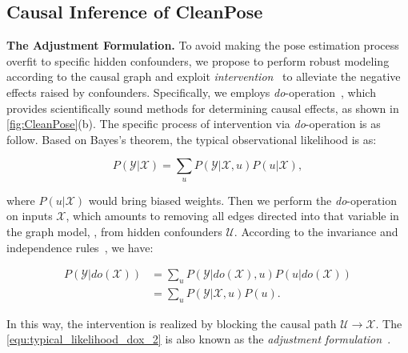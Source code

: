 \subsection{Causal Inference of CleanPose}
\label{sec:causal_inference}
{\bf The Adjustment Formulation.} 
To avoid making the pose estimation process overfit to specific hidden confounders, we propose to perform robust modeling according to the causal graph and exploit \emph{intervention}~\cite{pearl2009causality} to alleviate the negative effects raised by confounders. Specifically, we employs \emph{do}-operation~\cite{pearl2016causal}, which provides scientifically sound methods for determining causal effects, as shown in \cref{fig:CleanPose}(b). The specific process of intervention via \emph{do}-operation is as follow.
Based on Bayes's theorem, the typical observational likelihood is as:
\begin{small}
\begin{equation}
\label{equ:typical_likelihood}
    P(\mathcal{Y}|\mathcal{X}) = \sum_{u}P(\mathcal{Y}|\mathcal{X},u)P(u|\mathcal{X}),
\end{equation}
\end{small}
where $P(u|\mathcal{X})$ would bring biased weights. Then we perform the \emph{do}-operation on inputs $\mathcal{X}$, which amounts to removing all edges directed into that variable in the graph model, \ie, from hidden confounders $\mathcal{U}$. According to the invariance and independence rules~\cite{pearl2016causal}, we have:
\begin{small}
\begin{align}
    P(\mathcal{Y}|do(\mathcal{X})) &= \sum_{u}P(\mathcal{Y}|do(\mathcal{X}),u)P(u|do(\mathcal{X})) \label{equ:typical_likelihood_dox_1}\\
    &= \sum_{u}P(\mathcal{Y}|\mathcal{X},u)P(u) \label{equ:typical_likelihood_dox_2}.
\end{align}
\end{small}
In this way, the intervention is realized by blocking the causal path $\mathcal{U} \rightarrow \mathcal{X}$. The \cref{equ:typical_likelihood_dox_2} is also known as the \emph{adjustment formulation}~\cite{pearl2009causality}.

